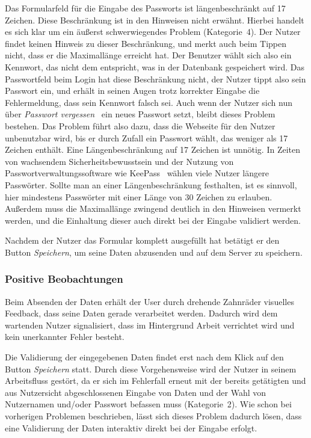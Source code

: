 {
Das Formularfeld für die Eingabe des Passworts ist längenbeschränkt auf 17 Zeichen. Diese Beschränkung ist in den Hinweisen nicht erwähnt.
}
{
Hierbei handelt es sich klar um ein äußerst schwerwiegendes Problem (Kategorie~4). Der Nutzer findet keinen Hinweis zu dieser Beschränkung, und merkt auch beim Tippen nicht, dass er die Maximallänge erreicht hat. Der Benutzer wählt sich also ein Kennwort, das nicht dem entspricht, was in der Datenbank gespeichert wird. Das Passwortfeld beim Login hat diese Beschränkung nicht, der Nutzer tippt also sein Passwort ein, und erhält in seinen Augen trotz korrekter Eingabe die Fehlermeldung, dass sein Kennwort falsch sei. Auch wenn der Nutzer sich nun über \emph{Passwort vergessen} ~ein neues Passwort setzt, bleibt dieses Problem bestehen. Das Problem führt also dazu, dass die Webseite für den Nutzer unbenutzbar wird, bis er durch Zufall ein Passwort wählt, das weniger als 17 Zeichen enthält.
}
{
Eine Längenbeschränkung auf 17 Zeichen ist unnötig. In Zeiten von wachsendem Sicherheitsbewusstsein und der Nutzung von Passwortverwaltungssoftware wie \glqq KeePass\grqq ~ wählen viele Nutzer längere Passwörter. Sollte man an einer Längenbeschränkung festhalten, ist es sinnvoll, hier mindestens Passwörter mit einer Länge von 30 Zeichen zu erlauben. Außerdem muss die Maximallänge zwingend deutlich in den Hinweisen vermerkt werden, und die Einhaltung dieser auch direkt bei der Eingabe validiert werden.
}
\label{prob:frei:passwortlaenge}

Nachdem der Nutzer das Formular komplett ausgefüllt hat betätigt er den Button \emph{Speichern}, um seine Daten abzusenden und auf dem Server zu speichern.

\subsubsection*{Positive Beobachtungen}
\label{subsubsec:freischaltung_absenden_positiv}
Beim Absenden der Daten erhält der User durch drehende Zahnräder visuelles Feedback, dass seine Daten gerade verarbeitet werden. Dadurch wird dem wartenden Nutzer signalisiert, dass im Hintergrund Arbeit verrichtet wird und kein unerkannter Fehler besteht.

{
Die Validierung der eingegebenen Daten findet erst nach dem Klick auf den Button \emph{Speichern} statt.
}
{
Durch diese Vorgehensweise wird der Nutzer in seinem Arbeitsfluss gestört, da er sich im Fehlerfall erneut mit der bereits getätigten und aus Nutzersicht abgeschlossenen Eingabe von Daten und der Wahl von Nutzernamen und/oder Passwort befassen muss (Kategorie~2).
}
{
Wie schon bei vorherigen Problemen beschrieben, lässt sich dieses Problem dadurch lösen, dass eine Validierung der Daten interaktiv direkt bei der Eingabe erfolgt.
}
\label{prob:frei:validierung}

